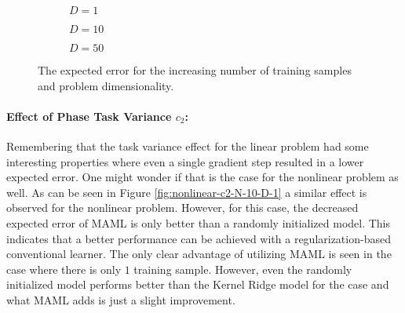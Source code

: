 \begin{figure}[!h]
  \centering
    \begin{subfigure}{0.32\textwidth}
      \centering
      \caption{$D=1$}
      \label{fig:nonlinear-N-D-1}
    \end{subfigure}
    \begin{subfigure}{0.32\textwidth}
      \centering
      \caption{$D=10$}
      \label{fig:nonlinear-N-D-10}
    \end{subfigure}
    \begin{subfigure}{0.32\textwidth}
      \centering
      \caption{$D=50$}
      \label{fig:nonlinear-N-D-50}
    \end{subfigure}
  \caption{The expected error for the increasing number of training samples and problem dimensionality.}\label{fig:nonlinear-N}
\end{figure}


\paragraph{Effect of Phase Task Variance $c_2$:} Remembering that the task variance effect for the linear problem had some interesting properties where even a single gradient step resulted in a lower expected error. One might wonder if that is the case for the nonlinear problem as well. As can be seen in Figure \ref{fig:nonlinear-c2-N-10-D-1} a similar effect is observed for the nonlinear problem. However, for this case, the decreased expected error of MAML is only better than a randomly initialized model. This indicates that a better performance can be achieved with a regularization-based conventional learner. The only clear advantage of utilizing MAML is seen in the case where there is only $1$ training sample. However, even the randomly initialized model performs better than the Kernel Ridge model for the case and what MAML adds is just a slight improvement. 

